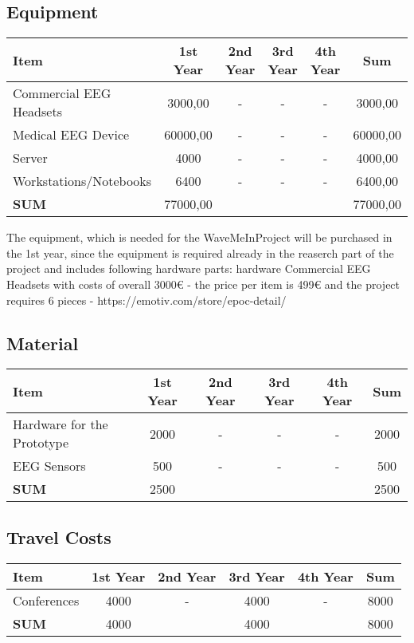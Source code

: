 \subsection{Equipment}
\begin{tabular}{|l|c|c|c|c|c|}
\hline 
Item & 1st Year & 2nd Year & 3rd Year & 4th Year & Sum \\ 
\hline 
Commercial EEG Headsets & 3000,00 & - & - & - & 3000,00 \\ 
\hline 
Medical EEG Device & 60000,00 & - & - & - & 60000,00 \\ 
\hline 
Server & 4000 & - & - & - & 4000,00 \\ 
\hline 
Workstations/Notebooks & 6400 & - & - & - & 6400,00 \\ 
\hline 
\textbf{SUM} & 77000,00 &  &  &  & 77000,00 \\ 
\hline 
\end{tabular}

The equipment, which is needed for the WaveMeInProject will be purchased in the 1st year, since the equipment is required already in the reaserch part of the project and includes following hardware parts:
hardware Commercial EEG Headsets with costs of overall 3000\euro{} - the price per item is 499\euro{} and the project requires 6 pieces - https://emotiv.com/store/epoc-detail/


\subsection{Material}
\begin{tabular}{|l|c|c|c|c|c|}
\hline 
Item & 1st Year & 2nd Year & 3rd Year & 4th Year & Sum \\ 
\hline 
Hardware for the Prototype & 2000 & - & - & - & 2000 \\ 
\hline 
EEG Sensors & 500 & - & - & - & 500 \\ 
\hline 
\textbf{SUM} & 2500 &  &  &  & 2500 \\ 
\hline 
\end{tabular} 

\subsection{Travel Costs}
\begin{tabular}{|l|c|c|c|c|c|}
\hline 
Item & 1st Year & 2nd Year & 3rd Year & 4th Year & Sum \\ 
\hline 
Conferences & 4000 & - & 4000 & - & 8000 \\ 
\hline 
\textbf{SUM} & 4000 &  & 4000 &  & 8000 \\ 
\hline 
\end{tabular} 

